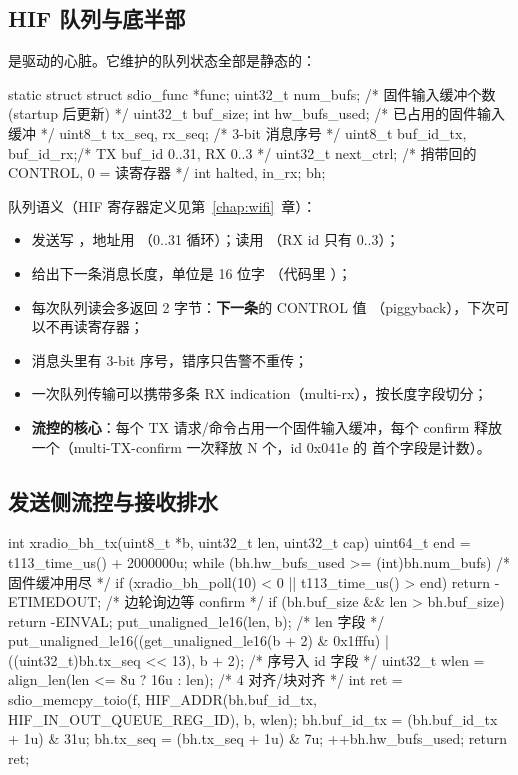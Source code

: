 \subsection{HIF 队列与底半部}

 是驱动的心脏。它维护的队列状态全部是静态的：

\begin{ccode}
static struct {
    struct sdio_func *func;
    uint32_t num_bufs;           /* 固件输入缓冲个数 (startup 后更新) */
    uint32_t buf_size;
    int hw_bufs_used;            /* 已占用的固件输入缓冲 */
    uint8_t tx_seq, rx_seq;      /* 3-bit 消息序号 */
    uint8_t buf_id_tx, buf_id_rx;/* TX buf_id 0..31, RX 0..3 */
    uint32_t next_ctrl;          /* 捎带回的 CONTROL, 0 = 读寄存器 */
    int halted, in_rx;
} bh;
\end{ccode}

队列语义（HIF 寄存器定义见第~\ref{chap:wifi}~章）：

\begin{itemize}
  \item 发送写 ，地址用 
        （0..31 循环）；读用 （RX id 只有 0..3）；
  \item {} 给出下一条消息长度，单位是 16 位字
        （代码里 ）；
  \item 每次队列读会多返回 2 字节：\textbf{下一条}的 CONTROL 值
        （piggyback），下次可以不再读寄存器；
  \item 消息头里有 3-bit 序号，错序只告警不重传；
  \item 一次队列传输可以携带多条 RX indication（multi-rx），按长度字段切分；
  \item \textbf{流控的核心}：每个 TX 请求/命令占用一个固件输入缓冲，每个
        confirm 释放一个（multi-TX-confirm 一次释放 N 个，id 0x041e 的
        首个字段是计数）。
\end{itemize}

\subsection{发送侧流控与接收排水}

\begin{ccode}
int xradio_bh_tx(uint8_t *b, uint32_t len, uint32_t cap)
{
    uint64_t end = t113_time_us() + 2000000u;
    while (bh.hw_bufs_used >= (int)bh.num_bufs) {      /* 固件缓冲用尽 */
        if (xradio_bh_poll(10) < 0 || t113_time_us() > end)
            return -ETIMEDOUT;                         /* 边轮询边等 confirm */
    }
    if (bh.buf_size && len > bh.buf_size)
        return -EINVAL;
    put_unaligned_le16(len, b);                        /* len 字段 */
    put_unaligned_le16((get_unaligned_le16(b + 2) & 0x1fffu) |
                       ((uint32_t)bh.tx_seq << 13), b + 2);  /* 序号入 id 字段 */
    uint32_t wlen = align_len(len <= 8u ? 16u : len);  /* 4 对齐/块对齐 */
    int ret = sdio_memcpy_toio(f, HIF_ADDR(bh.buf_id_tx,
                                        HIF_IN_OUT_QUEUE_REG_ID), b, wlen);
    bh.buf_id_tx = (bh.buf_id_tx + 1u) & 31u;
    bh.tx_seq = (bh.tx_seq + 1u) & 7u;
    ++bh.hw_bufs_used;
    return ret;
}
\end{ccode}

